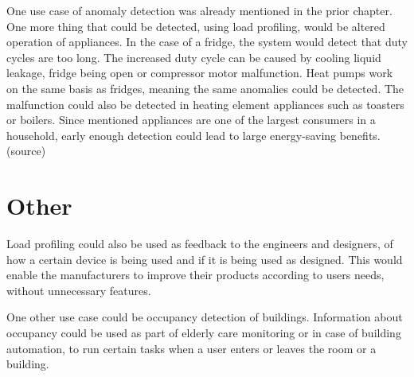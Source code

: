 \documentclass[
11pt, %
english, %
singlespacing, %
headsepline, %
]{MastersDoctoralThesis} %
\begin{document}
One use case of anomaly detection was already mentioned in the prior chapter.
One more thing that could be detected, using load profiling, would be altered operation of appliances.
In the case of a fridge, the system would detect that duty cycles are too long.
The increased duty cycle can be caused by cooling liquid leakage, fridge being open or compressor motor malfunction.
Heat pumps work on the same basis as fridges, meaning the same anomalies could be detected. 
The malfunction could also be detected in heating element appliances such as toasters or boilers. 
Since mentioned appliances are one of the largest consumers in a household, early enough detection could lead to large energy-saving benefits. (source)

\section{Other}

Load profiling could also be used as feedback to the engineers and designers,
of how a certain device is being used and if it is being used as designed. 
This would enable the manufacturers to improve their products according to 
users needs, without unnecessary features.

One other use case could be occupancy detection of buildings. Information about 
occupancy could be used as part of elderly care monitoring or in case of building
automation, to run certain tasks when a user enters or leaves the room or a building.





% 


\printbibliography[heading=bibintoc]
\end{document}
